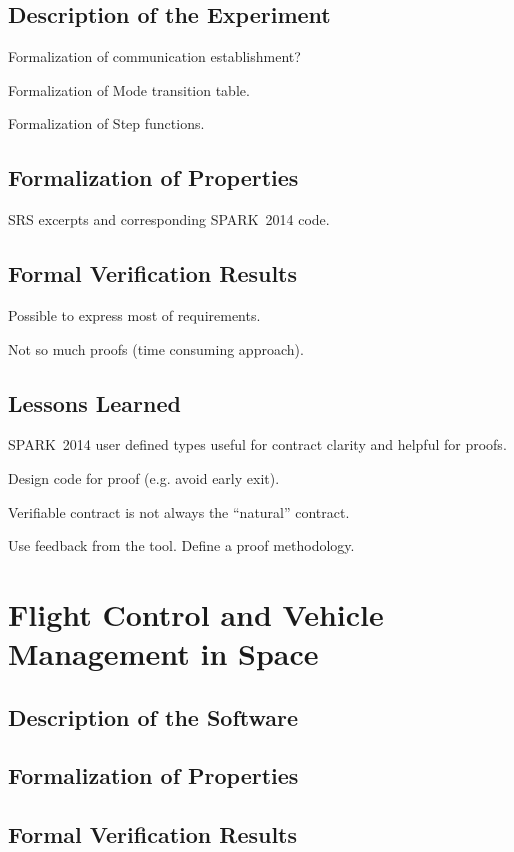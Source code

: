\documentclass{article}
\newcommand{\newspark}{SPARK~2014\xspace}
\begin{document}
\subsection{Description of the Experiment}

Formalization of communication establishment?

Formalization of Mode transition table.

Formalization of Step functions.

\subsection{Formalization of Properties}

SRS excerpts and corresponding \newspark code.

\subsection{Formal Verification Results}

Possible to express most of requirements.

Not so much proofs (time consuming approach).

\subsection{Lessons Learned}

\newspark user defined types useful for contract clarity and helpful
for proofs.

Design code for proof (e.g. avoid early exit).

Verifiable contract is not always the ``natural'' contract.

Use feedback from the tool. Define a proof methodology.

\section{Flight Control and Vehicle Management in Space}


\subsection{Description of the Software}
\subsection{Formalization of Properties}
\subsection{Formal Verification Results}
\end{document}
